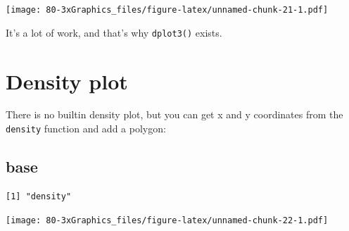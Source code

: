 \documentclass[
]{book}
\newenvironment{Shaded}{\begin{snugshade}}{\end{snugshade}}
\newcommand{\AttributeTok}[1]{\textcolor[rgb]{0.77,0.63,0.00}{#1}}
\newcommand{\FunctionTok}[1]{\textcolor[rgb]{0.00,0.00,0.00}{#1}}
\newcommand{\NormalTok}[1]{#1}
\newcommand{\OtherTok}[1]{\textcolor[rgb]{0.56,0.35,0.01}{#1}}
\newcommand{\SpecialCharTok}[1]{\textcolor[rgb]{0.00,0.00,0.00}{#1}}
\newcommand{\StringTok}[1]{\textcolor[rgb]{0.31,0.60,0.02}{#1}}
\begin{document}
\texttt{[image: 80-3xGraphics\_files/figure-latex/unnamed-chunk-21-1.pdf]}

It's a lot of work, and that's why \texttt{dplot3()} exists.

\hypertarget{density-plot-1}{%
\section{Density plot}\label{density-plot-1}}

There is no builtin density plot, but you can get x and y coordinates from the \texttt{density} function and add a polygon:

\hypertarget{base-3}{%
\subsection{base}\label{base-3}}

\begin{Shaded}
\end{Shaded}

\begin{verbatim}
[1] "density"
\end{verbatim}

\begin{Shaded}
\end{Shaded}

\texttt{[image: 80-3xGraphics\_files/figure-latex/unnamed-chunk-22-1.pdf]}
\end{document}
